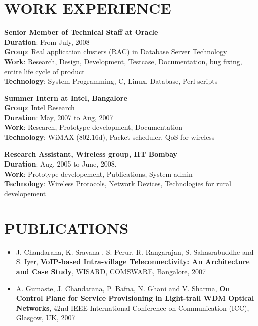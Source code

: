 \documentclass{res}
\begin{document}
\begin{resume}
					  \section{WORK EXPERIENCE} 
					  {\bf Senior Member of Technical Staff at Oracle}
					  \\{\bf Duration}:  From July, 2008\\
					  {\bf Group}: Real application clusters (RAC) in Database Server Technology\\ 
					  {\bf Work}: Research, Design, Development, Testcase, Documentation, bug fixing, entire life cycle of product\\
					  {\bf Technology}: System Programming, C, Linux, Database, Perl scripts

					  {\bf Summer Intern at Intel, Bangalore}\\
					  {\bf Group}: Intel Research 
					  \\{\bf Duration}: May, 2007 to Aug, 2007
					  \\{\bf Work}: Research, Prototype development, Documentation
					  \\{\bf Technology}: WiMAX (802.16d), Packet scheduler, QoS for wireless


					  {\bf Research Assistant, Wireless group, IIT Bombay} 
					  \\{\bf Duration}: Aug, 2005 to June, 2008.
					  \\{\bf Work}: Prototype developement, Publications, System admin
					  \\{\bf Technology}: Wireless Protocols, Network Devices, Technologies for rural developement  

					  \vspace{0.2in} 

				      \section{PUBLICATIONS} 
					  \begin{itemize}
					  \item  J. Chandarana, K. Sravana , S. Perur, R. Rangarajan, S. Sahasrabuddhe and S. Iyer, {\bf VoIP-based
					  Intra-village Teleconnectivity: An Architecture and Case Study}, WISARD, COMSWARE,
					  Bangalore, 2007

					  \item A. Gumaste, J. Chandarana, P. Bafna, N. Ghani and V. Sharma, {\bf On Control Plane for Service
					  Provisioning in Light-trail WDM Optical Networks}, 42nd IEEE International Conference on
					  Communication (ICC), Glasgow, UK, 2007


\end{itemize}
\end{resume}
\end{document}

